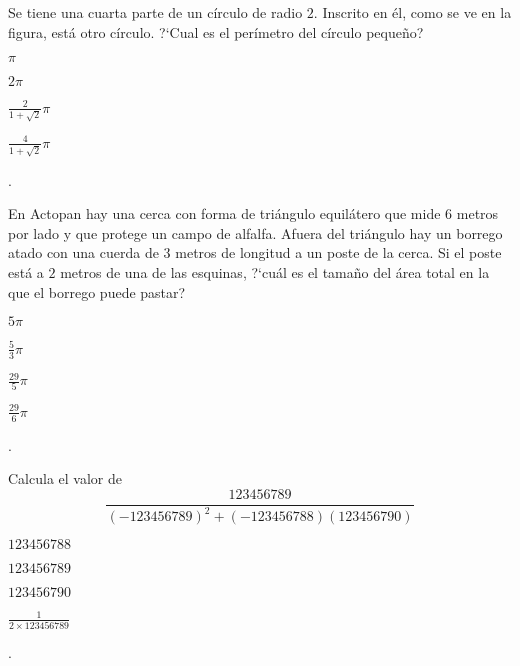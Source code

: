 \begin{Problema}{3}
Se tiene una cuarta parte de un c\'irculo de radio $2$. Inscrito
  en \'el, como se ve en la figura, est\'a otro c\'irculo. ?`Cual es el per\'imetro del c\'irculo peque\~no?

\begin{inparaenum}
\item $\pi$ \espc
\item $2 \pi$ \espc
\item $\frac{2}{1+\sqrt{2}} \pi$ \espm
\item $\frac{4}{1+\sqrt{2}} \pi$ \espm
\item \nota.
\end{inparaenum}

\end{Problema}

\begin{Problema}{4}
  En Actopan hay una cerca con forma de tri\'angulo equil\'atero
  que mide $6$ metros por lado y que protege un campo de
  alfalfa. Afuera del tri\'angulo hay un borrego atado 
 con una cuerda de $3$ metros de longitud a un poste de la cerca. Si el poste
  est\'a a $2$ metros de una de las esquinas, ?`cu\'al es el tama\~no
  del \'area total en la que el borrego puede pastar?


\begin{inparaenum}
\item $5\pi$ \espm
\item $\frac{5}{3}\pi$ \espm
\item $\frac{29}{5} \pi$ \espm
\item $\frac{29}{6} \pi$ \espm
\item \nota.
\end{inparaenum}
\end{Problema}

\begin{Problema}{5}
  Calcula el valor de
$$
\frac{123456789}{(-123456789)^2+(-123456788)(123456790)}
$$

\begin{inparaenum}
\item $123456788$ \espsc
\item $123456789$ \espsc
\item $123456790$ \espsc
\item $\frac{1}{2\times123456789}$ \espsc
\item \nota.
\end{inparaenum}
\end{Problema}

